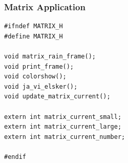 \documentclass[../main.tex]{subfiles}
\begin{document}
\subsubsection{Matrix Application}
\label{apx:matrix_application}


\begin{listing}[H]
    \begin{verbatim}
#ifndef MATRIX_H
#define MATRIX_H

void matrix_rain_frame();
void print_frame();
void colorshow();
void ja_vi_elsker();
void update_matrix_current();

extern int matrix_current_small;
extern int matrix_current_large;
extern int matrix_current_number;

#endif
    \end{verbatim}
    \caption{Implementation of \texttt{matrix.h}}
    \label{lst:matrix_h}
\end{listing}
\end{document}
